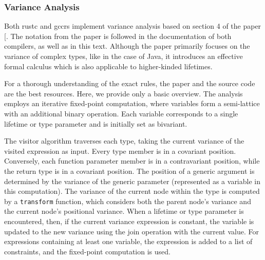 \documentclass[
  11pt,
  twoside]{report}
\begin{document}
\subsubsection{Variance Analysis}\label{sec:variance-analysis}

Both rustc and gccrs implement variance analysis based on section 4 of
the paper {[}\citeproc{ref-Altidor2011}{16}{]}. The notation from the
paper is followed in the documentation of both compilers, as well as in
this text. Although the paper primarily focuses on the variance of
complex types, like in the case of Java, it introduces an effective
formal calculus which is also applicable to higher-kinded lifetimes.

For a thorough understanding of the exact rules, the paper and the
source code are the best resources. Here, we provide only a basic
overview. The analysis employs an iterative fixed-point computation,
where variables form a semi-lattice with an additional binary operation.
Each variable corresponds to a single lifetime or type parameter and is
initially set as bivariant.

The visitor algorithm traverses each type, taking the current variance
of the visited expression as input. Every type member is in a covariant
position. Conversely, each function parameter member is in a
contravariant position, while the return type is in a covariant
position. The position of a generic argument is determined by the
variance of the generic parameter (represented as a variable in this
computation). The variance of the current node within the type is
computed by a \texttt{transform} function, which considers both the
parent node's variance and the current node's positional variance. When
a lifetime or type parameter is encountered, then, if the current
variance expression is constant, the variable is updated to the new
variance using the join operation with the current value. For
expressions containing at least one variable, the expression is added to
a list of constraints, and the fixed-point computation is used.
\end{document}
